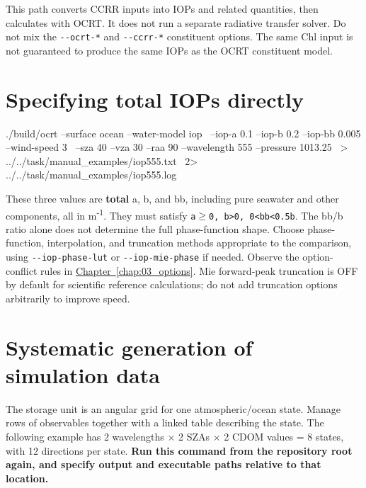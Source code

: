 This path converts CCRR inputs into IOPs and related quantities, then calculates with OCRT. It does not run a separate radiative transfer solver. Do not mix the \texttt{-\allowbreak{}-\allowbreak{}ocrt-\allowbreak{}*} and \texttt{-\allowbreak{}-\allowbreak{}ccrr-\allowbreak{}*} constituent options. The same Chl input is not guaranteed to produce the same IOPs as the OCRT constituent model.

\section{Specifying total IOPs directly}
\label{sec:auto:04_examples:10}

\par\noindent\begin{minipage}{\linewidth}
\begin{ManualCode}
./build/ocrt --surface ocean --water-model iop \
  --iop-a 0.1 --iop-b 0.2 --iop-bb 0.005 --wind-speed 3 \
  --sza 40 --vza 30 --raa 90 --wavelength 555 --pressure 1013.25 \
  > ../../task/manual_examples/iop555.txt \
  2> ../../task/manual_examples/iop555.log
\end{ManualCode}
\end{minipage}\par

These three values are \textbf{total} a, b, and bb, including pure seawater and other components, all in m\textsuperscript{-}\textsuperscript{1}. They must satisfy \texttt{a\ensuremath{\geq}0,\allowbreak{} b>0,\allowbreak{} 0<bb<0.\allowbreak{}5b}. The bb/b ratio alone does not determine the full phase-function shape. Choose phase-function, interpolation, and truncation methods appropriate to the comparison, using \texttt{-\allowbreak{}-\allowbreak{}iop-\allowbreak{}phase-\allowbreak{}lut} or \texttt{-\allowbreak{}-\allowbreak{}iop-\allowbreak{}mie-\allowbreak{}phase} if needed. Observe the option-conflict rules in \hyperref[chap:03_options]{Chapter~\ref*{chap:03_options}}. Mie forward-peak truncation is OFF by default for scientific reference calculations; do not add truncation options arbitrarily to improve speed.

\section{Systematic generation of simulation data}
\label{sec:auto:04_examples:11}
The storage unit is an angular grid for one atmospheric/ocean state. Manage rows of observables together with a linked table describing the state. The following example has 2 wavelengths \ensuremath{\times} 2 SZAs \ensuremath{\times} 2 CDOM values = 8 states, with 12 directions per state. \textbf{Run this command from the repository root again, and specify output and executable paths relative to that location.}


